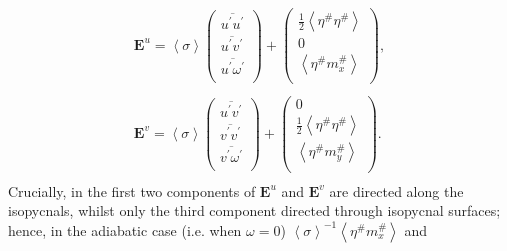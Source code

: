 \documentclass[12pt,a4paper]{report}
\newcommand*\thkmean[1]{\overline{#1}}
\newcommand*\thkres[1]{{#1}^{\prime}}
\newcommand*\nthkmean[1]{\left\langle{#1}\right\rangle}
\newcommand*\nthkres[1]{{#1}^{\#}}
\newcommand*{\half}{\frac{1}{2}}
\begin{document}
\begin{subequations}
\begin{equation}
\begin{array}{c}
                   \boldsymbol{E}^{u}=\nthkmean{\sigma}\left(
                   \begin{array}{c}
                   \thkmean{\thkres{u}\thkres{u}} \\
                   \thkmean{\thkres{u}\thkres{v}} \\
                    \thkmean{\thkres{u}\thkres{\omega}} \\
                   \end{array}\right)+\left(
                   \begin{array}{c}
                   \half \nthkmean{\nthkres{\eta}\nthkres{\eta}} \\
                   0 \\
                   \nthkmean{\nthkres{\eta}\nthkres{m}_{x}} \\
                   \end{array}\right), \\ \\
                   \boldsymbol{E}^{v}=\nthkmean{\sigma}\left(
                   \begin{array}{c}
                   \thkmean{\thkres{u}\thkres{v}} \\
                   \thkmean{\thkres{v}\thkres{v}} \\
                   \thkmean{\thkres{v}\thkres{\omega}} \\
                   \end{array}\right)+\left(
                   \begin{array}{c}
                   0\\
                   \half \nthkmean{\nthkres{\eta}\nthkres{\eta}} \\
                   \nthkmean{\nthkres{\eta}\nthkres{m}_{y}} \\
                   \end{array}\right). \\
                   \end{array}
                   \end{equation}
                \end{subequations}
                   Crucially, in \cite{young2012exact} the first two components of  $\boldsymbol{E}^{u}$ and $\boldsymbol{E}^{v}$ are directed along 
                   the isopycnals, whilst only  the third component directed through 
                   isopycnal surfaces; hence, in the adiabatic case (i.e. when $\omega=0$)
                   $ \nthkmean{\sigma}^{-1}\nthkmean{\nthkres{\eta}\nthkres{m}_{x}}$ and 
\end{document}
